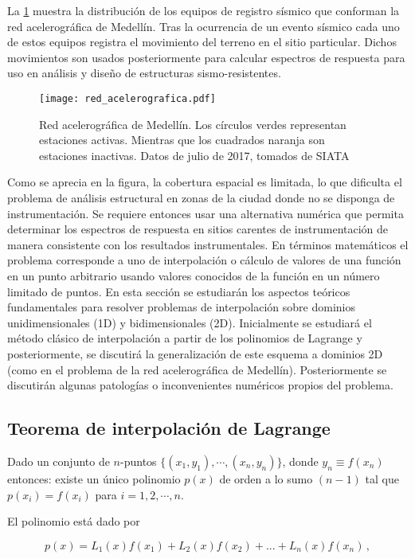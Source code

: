 La \cref{fig:ram} muestra la distribución de los equipos de registro sísmico que conforman la red acelerográfica de Medellín. Tras la ocurrencia de un evento sísmico cada uno de estos equipos registra el movimiento del terreno en el sitio particular. Dichos movimientos son usados posteriormente para calcular espectros de respuesta para uso en análisis y diseño de estructuras sismo-resistentes.

\begin{figure}[H]
\centering
\texttt{[image: red\_acelerografica.pdf]}
\caption{Red acelerográfica de Medellín. Los círculos verdes representan estaciones activas. Mientras que los cuadrados naranja son estaciones inactivas. Datos de julio de 2017, tomados de SIATA\cite{SIATA_acelerografica}}
\label{fig:ram}
\end{figure}

Como se aprecia en la figura, la cobertura espacial es limitada, lo que dificulta el problema de análisis estructural en zonas de la ciudad donde no se disponga de instrumentación. Se requiere entonces usar una alternativa numérica que permita determinar los espectros de respuesta en sitios carentes de instrumentación de manera consistente con los resultados instrumentales. En términos matemáticos el problema corresponde a uno de interpolación o cálculo de valores de una función en un punto arbitrario usando valores conocidos de la función en un número limitado de puntos. En esta sección se estudiarán los aspectos teóricos fundamentales para resolver problemas de interpolación sobre dominios unidimensionales (1D) y bidimensionales (2D). Inicialmente se estudiará el método clásico de interpolación a partir de los polinomios de Lagrange y posteriormente, se discutirá la generalización de este esquema a dominios 2D (como en el problema de la red 
acelerográfica de Medellín). Posteriormente se discutirán algunas patologías o inconvenientes numéricos propios del problema.

\subsection{Teorema de interpolación de Lagrange}
Dado un conjunto de $n$-puntos $\{ (x_1, y_1),\cdots,(x_n, y_n)\}$, donde $y_n 
\equiv f({x_n})$ entonces: existe un único polinomio $p(x)$ de orden a lo sumo 
$(n-1)$ tal que $p(x_i) = f(x_i)$ para $i = 1, 2, \cdots, n$.

El polinomio está dado por

\begin{equation}\label{eq:interp_pol}
  p(x) = L_1(x) f(x_1)+L_2(x) f(x_2)+...+L_n(x) f(x_n)\, ,
\end{equation}

